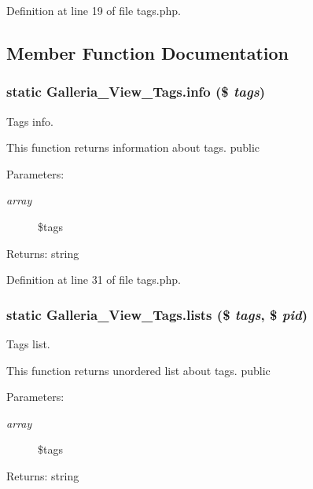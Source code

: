 Definition at line 19 of file tags.php.

\subsection{Member Function Documentation}
\subsubsection{\setlength{\rightskip}{0pt plus 5cm}static Galleria\_\-View\_\-Tags.info (\$ {\em tags})\hspace{0.3cm}{\tt  [static]}}\label{classGalleria__View__Tags_4c6b6216915968ba5f778a88cbc75709}


Tags info.

This function returns information about tags.  public

\begin{Desc}
\item[Parameters:]
\begin{description}
\item[{\em array}]\$tags \end{description}
\end{Desc}
\begin{Desc}
\item[Returns:]string \end{Desc}


Definition at line 31 of file tags.php.
\subsubsection{\setlength{\rightskip}{0pt plus 5cm}static Galleria\_\-View\_\-Tags.lists (\$ {\em tags}, \$ {\em pid})\hspace{0.3cm}{\tt  [static]}}\label{classGalleria__View__Tags_0add0141b5ada33c802aa6264eb218b3}


Tags list.

This function returns unordered list about tags.  public

\begin{Desc}
\item[Parameters:]
\begin{description}
\item[{\em array}]\$tags \end{description}
\end{Desc}
\begin{Desc}
\item[Returns:]string \end{Desc}


